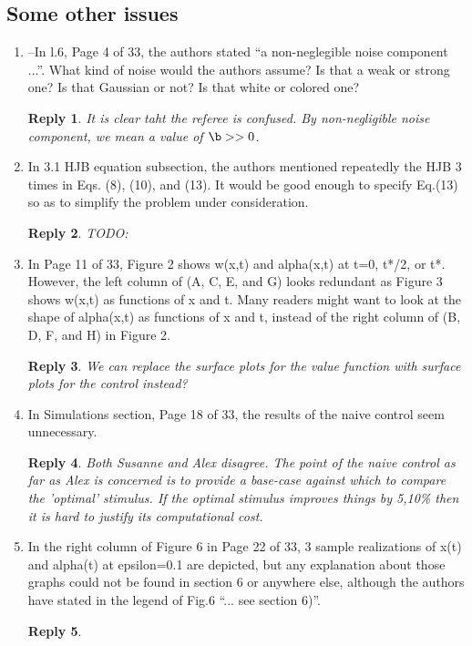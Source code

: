 \documentclass{article}
\newtheorem*{rep}{Reply}
\begin{document}
\subsection{Some other issues}
\begin{enumerate}
  \item 
--In l.6, Page 4 of 33, the authors stated “a non-neglegible noise component
...”. What kind of noise would the authors assume? Is that a weak or strong one?
Is that Gaussian or not? Is that white or colored one?
\begin{rep}
It is clear taht the referee is confused. By non-negligible noise component, we
mean a value of $\b >> 0 $.
\end{rep}


\item In 3.1 HJB equation subsection, the authors mentioned repeatedly the HJB 3
times in Eqs. (8), (10), and (13). It would be good enough to specify Eq.(13) so
as to simplify the problem under consideration.
\begin{rep}
TODO:
\end{rep}

\item In Page 11 of 33, Figure 2 shows w(x,t) and alpha(x,t) at t=0, t*/2, or t*.
However, the left column of (A, C, E, and G) looks redundant as Figure 3 shows
w(x,t) as functions of x and t. Many readers might want to look at the shape of
alpha(x,t) as functions of x and t, instead of the right column of (B, D, F, and
H) in Figure 2.
\begin{rep}
We can replace the surface plots for the value function with surface plots for
the control instead?
\end{rep}

\item In Simulations section, Page 18 of 33, the results of the naive control seem
unnecessary.
\begin{rep}
Both Susanne and Alex disagree. The point of the naive control as far as Alex is
concerned is to provide a base-case against which to compare the 'optimal'
stimulus. If the optimal stimulus improves things by 5,10\% then it is  hard to
justify its computational cost. 
\end{rep}


\item In the right column of Figure 6 in Page 22 of 33, 3 sample realizations of
x(t) and alpha(t) at epsilon=0.1 are depicted, but any explanation about those
graphs could not be found in section 6 or anywhere else, although the authors
have stated in the legend of Fig.6 “... see section 6)”.
\begin{rep}


\end{rep}
\end{enumerate}
\end{document}
